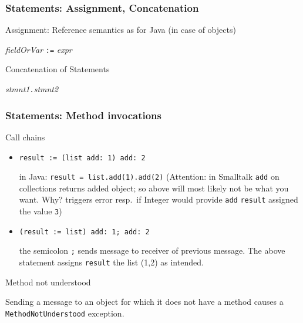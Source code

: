 \documentclass[handout]{beamer}
\newcommand{\Blue}[1]{\color{blue}#1\color{black}}
\begin{document}

\begin{frame}[fragile]
\frametitle{Statements: Assignment, Concatenation}

\Blue{Assignment}: Reference semantics as for Java (in case of objects)
\begin{center}
\textit{fieldOrVar} \alert{\texttt{:=}} \textit{expr}
\end{center}

\pause\bigskip

\Blue{Concatenation of Statements}

\begin{center}
\textit{stmnt1}{\huge\alert{\texttt{.}}}\textit{stmnt2}
\end{center}

\end{frame}



\begin{frame}[fragile]
\frametitle{Statements: Method invocations}

\Blue{Call chains}

\begin{itemize}
\item<1->
\begin{lstlisting}[language=Smalltalk]
result := (list add: 1) add: 2
\end{lstlisting} 
in Java: \texttt{result = list.add(1).add(2)} (Attention: in Smalltalk
\texttt{add} on collections returns added object; so above will most
likely not be what you want. Why?  triggers error resp.\ 
if Integer would provide \texttt{add} \texttt{result} assigned the value \texttt{3}) 
\item<2-> 
\begin{lstlisting}[language=Smalltalk]
(result := list) add: 1; add: 2
\end{lstlisting} 
the semicolon \texttt{;} sends message to receiver of previous
message. The above statement assigns \texttt{result} the list (1,2) as intended.

\end{itemize}


\Blue{Method not understood}

Sending a message to an object for which it does not have a method
causes a \texttt{MethodNotUnderstood} exception.


\end{frame}
\end{document}
